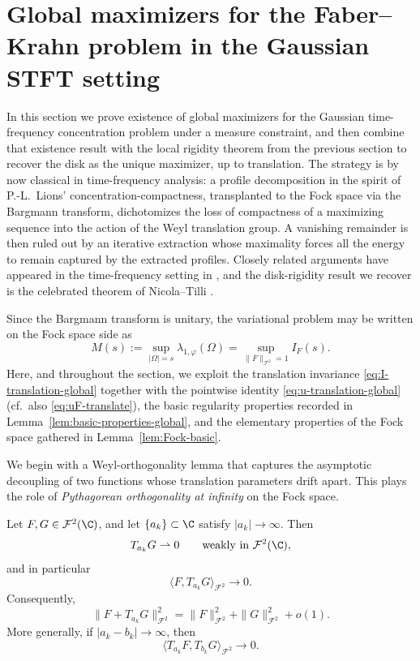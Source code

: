 \section{Global maximizers for the Faber--Krahn problem in the Gaussian STFT setting}\label{sec:global-max}

In this section we prove existence of global maximizers for the Gaussian
time-frequency concentration problem under a measure constraint, and then
combine that existence result with the local rigidity theorem from the previous
section to recover the disk as the unique maximizer, up to translation. The
strategy is by now classical in time-frequency analysis: a profile decomposition
in the spirit of P.-L.~Lions' concentration-compactness, transplanted to the
Fock space via the Bargmann transform, dichotomizes the loss of compactness of a
maximizing sequence into the action of the Weyl translation group. A vanishing
remainder is then ruled out by an iterative extraction whose maximality forces
all the energy to remain captured by the extracted profiles. Closely related
arguments have appeared in the time-frequency setting in
\cite{Nicola-Romero-Trapasso, Marceca-Romero-Speckbacher, Fulsche-Hagger,
Samuelsen}, and the disk-rigidity result we recover is the celebrated theorem
of Nicola--Tilli \cite{Nicola-Tilli, Nicola-Tilli-2}.

Since the Bargmann transform is unitary, the variational problem may be written
on the Fock space side as
\[
M(s):=\sup_{|\Omega|=s}\lambda_{1,\varphi}(\Omega)
=
\sup_{\|F\|_{\mathcal F^2}=1} I_F(s).
\]
Here, and throughout the section, we exploit the translation invariance
\eqref{eq:I-translation-global} together with the pointwise identity
\eqref{eq:u-translation-global} (cf.\ also \eqref{eq:uF-translate}), the
basic regularity properties recorded in Lemma~\ref{lem:basic-properties-global},
and the elementary properties of the Fock space gathered in
Lemma~\ref{lem:Fock-basic}.

We begin with a Weyl-orthogonality lemma that captures the asymptotic
decoupling of two functions whose translation parameters drift apart. This
plays the role of \emph{Pythagorean orthogonality at infinity} on the Fock
space.

\begin{lemma}\label{lem:weyl-orthogonality-global}
Let \(F,G\in \mathcal F^2(\C)\), and let \(\{a_k\}\subset \C\) satisfy
\(|a_k|\to \infty\). Then
\[
T_{a_k}G \rightharpoonup 0
\qquad\text{weakly in }\mathcal F^2(\C),
\]
and in particular
\[
\langle F,T_{a_k}G\rangle_{\mathcal F^2}\to 0.
\]
Consequently,
\[
\|F+T_{a_k}G\|_{\mathcal F^2}^2
=
\|F\|_{\mathcal F^2}^2+\|G\|_{\mathcal F^2}^2+o(1).
\]
More generally, if \(|a_k-b_k|\to\infty\), then
\[
\langle T_{a_k}F,T_{b_k}G\rangle_{\mathcal F^2}\to 0.
\]
\end{lemma}

